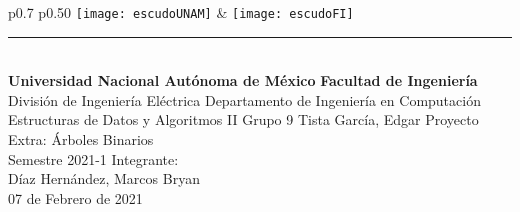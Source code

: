 \begin{titlepage}
	\begin{center}
		{ 
			\begin{tabular}{p{0.7\textwidth} p{0.50\textwidth} }
				\texttt{[image: escudoUNAM]} &  \texttt{[image: escudoFI]}
			\end{tabular}
		}
		
		\textcolor{azul}{\rule{\linewidth}{0.8mm}}\\
		\vfill
		{\LARGE \textbf{Universidad Nacional Autónoma de México}}
		\vfill
		{\LARGE \textbf{Facultad de Ingeniería}}
		\vfill
		{\Large {División de Ingeniería Eléctrica}}
		\vfill
		{\Large {Departamento de Ingeniería en Computación}}
		\vfill
		{\huge {Estructuras de Datos y Algoritmos II}}
		\vfill
		{\LARGE {Grupo 9}}
		\vfill
		{\LARGE {Tista García, Edgar}}
		\vfill
		{\LARGE {Proyecto Extra: Árboles Binarios\\}}
		\vspace{3mm}
		{\LARGE {Semestre 2021-1}}
		\vfill
		{\Large {Integrante:\\}}
		\vspace{3mm}
		{\Large {Díaz Hernández, Marcos Bryan\\}}
		\vspace{3mm}
		{\LARGE {07 de Febrero de 2021}}
	\end{center}
\end{titlepage}